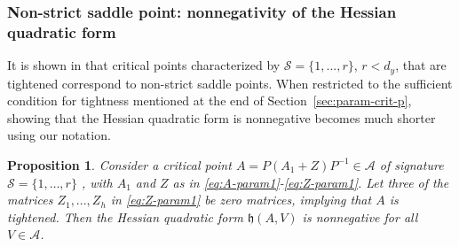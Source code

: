 \documentclass{article}
\newtheorem{proposition}{Proposition}
\newcommand{\1}{\mathds{1}}
\begin{document}
\subsubsection{Non-strict saddle point: nonnegativity of the Hessian quadratic form}
It is shown in \cite{achour2021loss} that critical points characterized by $\mathcal{S}=\{1,...,r\}$, $r<d_y$, that are tightened correspond to non-strict saddle points. 
When restricted to the sufficient condition for tightness mentioned at the end of Section~\ref{sec:param-crit-p}, showing that the Hessian quadratic form is nonnegative becomes much shorter using our notation.


\begin{proposition}
    Consider a critical point $  A = P(A_1 +Z ) P^{-1} \in \mathcal{A}$ of signature $ \mathcal{S} = \{1, \ldots, r\}$ , with $A_1 $ and $ Z $ as in \eqref{eq:A-param1}-\eqref{eq:Z-param1}. Let three of the matrices $Z_1,...,Z_h$ in \eqref{eq:Z-param1} be zero matrices, implying that $A$ is tightened. Then the Hessian quadratic form $ \mathfrak{h}(A,V)$ is nonnegative for all $ V \in \mathcal{A}$.
\end{proposition}
\end{document}
